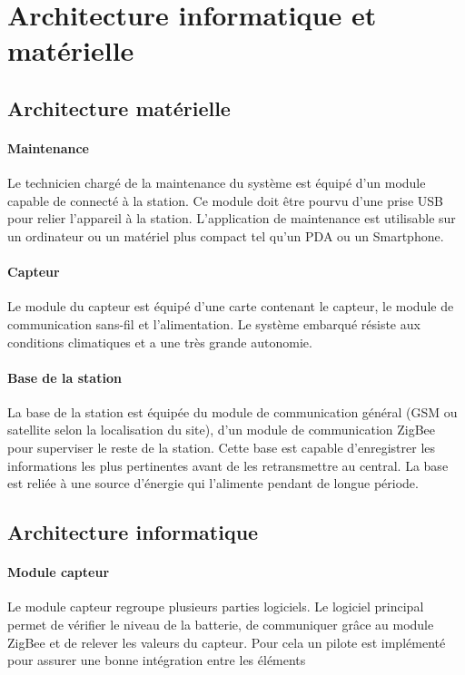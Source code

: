 \section{Architecture informatique et matérielle}

\subsection{Architecture matérielle}

\paragraph{Maintenance} Le technicien chargé de la maintenance du système est équipé d’un module capable de connecté à la station. Ce module doit être pourvu d’une prise USB pour relier l’appareil à la station. L’application de maintenance est utilisable sur un ordinateur  ou un matériel plus compact tel qu’un PDA ou un Smartphone. 

\paragraph{Capteur} Le module du capteur est équipé d’une carte contenant le capteur, le module de communication sans-fil et l’alimentation. Le système embarqué résiste aux conditions climatiques et a une très grande autonomie.

\paragraph{Base de la station} La base de la station est équipée du module de communication général  (GSM ou satellite selon la localisation du site), d’un module de communication ZigBee pour superviser le reste de la station. Cette base est capable d’enregistrer les informations les plus pertinentes avant de les retransmettre au central. La base est reliée à une source d’énergie qui l’alimente pendant de longue période. 

\subsection{Architecture informatique}

\paragraph{Module capteur} Le module capteur regroupe plusieurs parties logiciels. Le logiciel principal permet de vérifier le niveau de la batterie, de communiquer grâce au module ZigBee et de relever les valeurs du capteur. Pour cela un pilote est implémenté pour assurer une bonne intégration entre les éléments

